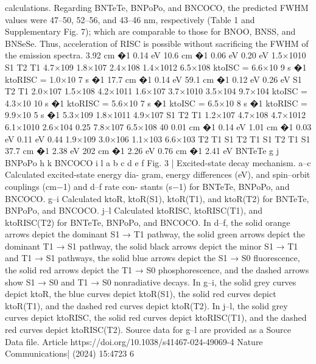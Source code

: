 calculations. Regarding BNTeTe, BNPoPo, and BNCOCO, the predicted
FWHM values were 47–50, 52–56, and 43–46 nm, respectively (Table 1
and Supplementary Fig. 7); which are comparable to those for BNOO,
BNSS, and BNSeSe. Thus, acceleration of RISC is possible without
sacriﬁcing the FWHM of the emission spectra.
3.92 cm
�1
0.14 eV 
10.6 cm
�1
0.06 eV
0.20 eV 
1.5×1010
S1
T2
T1
4.7×109
1.8×107
2.4×108
1.4×1012
6.5×108
ktoISC = 6.6×10
9 s
�1  ktoRISC = 1.0×10
7 s
�1
17.7 cm
�1
0.14 eV 
59.1 cm
�1
0.12 eV 
0.26 eV 
S1
T2
T1
2.0×107
1.5×108
4.2×1011
1.6×107
3.7×1010
3.5×104
9.7×104
ktoISC = 4.3×10
10 s
�1  ktoRISC = 5.6×10
7 s
�1
ktoISC = 6.5×10
8 s
�1  ktoRISC = 9.9×10
5 s
�1
5.3×109
1.8×1011
4.9×107
S1
T2
T1
1.2×107
4.7×108
4.7×1012
6.1×1010
2.6×104
0.25
7.8×107
6.5×108
40
0.01 cm
�1
0.14 eV 
1.01 cm
�1
0.03 eV 
0.11 eV 
0.44
1.9×109
3.0×106
1.1×103
6.6×103
T2
T1
S1
T2
T1
S1
T2
T1
S1
37.7 cm
�1
2.38 eV 
202 cm
�1
2.26 eV 
0.76 cm
�1
2.41 eV 
BNTeTe
g 
j 
BNPoPo
h 
k 
BNCOCO
i 
l 
a
b
c
d
e
f
Fig. 3 | Excited-state decay mechanism. a–c Calculated excited-state energy dia-
gram, energy differences (eV), and spin–orbit couplings (cm−1) and d–f rate con-
stants (s−1) for BNTeTe, BNPoPo, and BNCOCO. g–i Calculated ktoR, ktoR(S1), ktoR(T1),
and ktoR(T2) for BNTeTe, BNPoPo, and BNCOCO. j–l Calculated ktoRISC, ktoRISC(T1),
and ktoRISC(T2) for BNTeTe, BNPoPo, and BNCOCO. In d–f, the solid orange arrows
depict the dominant S1 → T1 pathway, the solid green arrows depict the dominant
T1 → S1 pathway, the solid black arrows depict the minor S1 → T1 and T1 → S1
pathways, the solid blue arrows depict the S1 → S0 ﬂuorescence, the solid red arrows
depict the T1 → S0 phosphorescence, and the dashed arrows show S1 → S0 and
T1 → S0 nonradiative decays. In g–i, the solid grey curves depict ktoR, the blue curves
depict ktoR(S1), the solid red curves depict ktoR(T1), and the dashed red curves
depict ktoR(T2). In j–l, the solid grey curves depict ktoRISC, the solid red curves depict
ktoRISC(T1), and the dashed red curves depict ktoRISC(T2). Source data for g–l are
provided as a Source Data ﬁle.
Article
https://doi.org/10.1038/s41467-024-49069-4
Nature Communications|        (2024) 15:4723 
6


